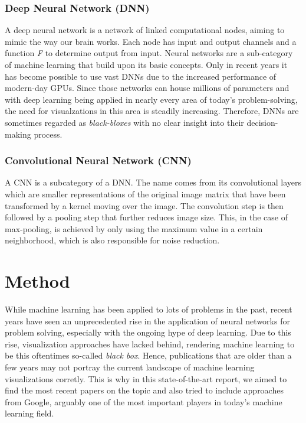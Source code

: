 \documentclass{acmsiggraph}               %
\begin{document}
\subsubsection{Deep Neural Network (DNN)}
A deep neural network is a network of linked computational nodes, aiming to mimic the way our brain works. Each node has input and output channels and a function \textit{F} to determine output from input. Neural networks are a sub-category of machine learning that build upon its basic concepts. Only in recent years it has become possible to use vast DNNs due to the increased performance of modern-day GPUs. Since those networks can house millions of parameters and with deep learning being applied in nearly every area of today's problem-solving, the need for visualzations in this area is steadily increasing. Therefore, DNNs are sometimes regarded as \textit{black-bloxes} with no clear insight into their decision-making process.

\subsubsection{Convolutional Neural Network (CNN)}
A CNN is a subcategory of a DNN. The name comes from its convolutional layers which are smaller representations of the original image matrix that have been transformed by a kernel moving over the image. The convolution step is then followed by a pooling step that further reduces image size. This, in the case of max-pooling, is achieved by only using the maximum value in a certain neighborhood, which is also responsible for noise reduction.

\section{Method}
While machine learning has been applied to lots of problems in the past, recent years have seen an unprecedented rise in the application of neural networks for problem solving, especially with the ongoing hype of deep learning. Due to this rise, visualization approaches have lacked behind, rendering machine learning to be this oftentimes so-called \textit{black box}. Hence, publications that are older than a few years may not portray the current landscape of machine learning visualizations corretly. This is why in this state-of-the-art report, we aimed to find the most recent papers on the topic and also tried to include approaches from Google, arguably one of the most important players in today's machine learning field.
\end{document}
